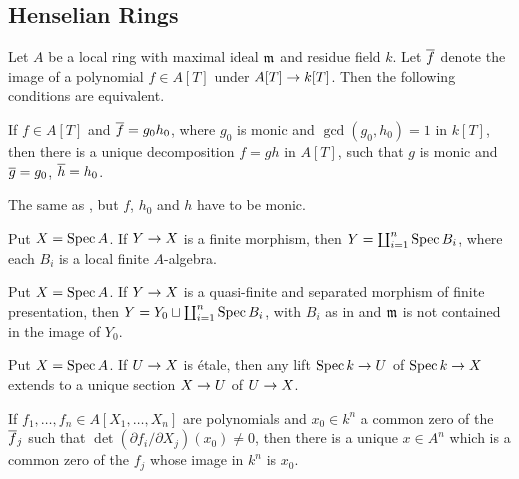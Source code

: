 \documentclass[a4paper, 10pt, oneside, DIV=9, chapterprefix=true, numbers=enddot, bibliography=totoc]{scrbook}
\begin{document}
\subsection{Henselian Rings}
\begin{prop}\label{prop:henselian}
	Let $A$ be a local ring with maximal ideal $\mathfrak{m}$ and residue field $k$. Let $\ov{f}$ denote the image of a polynomial $f\in A[T]$ under $A[T]\morphism k[T]$. Then the following conditions are equivalent.
	\begin{alphanumerate}
		\item If $f\in A[T]$ and $\ov{f}=g_0h_0$, where $g_0$ is monic and $\gcd(g_0,h_0)=1$ in $k[T]$, then there is a unique decomposition $f=gh$ in $A[T]$, such that $g$ is monic and $\ov{g}=g_0$, $\ov{h}=h_0$.
		\item The same as , but $f$, $h_0$ and $h$ have to be monic.
		\item Put $X=\operatorname{Spec} A$. If $Y\morphism X$ is a finite morphism, then $Y=\coprod_{i=1}^n\operatorname{Spec} B_i$, where each $B_i$ is a local finite $A$-algebra.
		\item Put $X=\operatorname{Spec} A$. If $Y\morphism X$ is a quasi-finite and separated morphism of finite presentation, then $Y=Y_0\sqcup\coprod_{i=1}^n\operatorname{Spec} B_i$, with $B_i$ as in  and $\mathfrak{m}$ is not contained in the image of $Y_0$.
		\item Put $X=\operatorname{Spec} A$. If $U\morphism X$ is étale, then any lift $\Spec k\morphism U$ of $\Spec k\morphism X$ extends to a unique section $X\morphism U$ of $U\morphism X$.
		\item If $f_1,\dotsc,f_n\in A[X_1,\dotsc,X_n]$ are polynomials and $x_0\in k^n$ a common zero of the $\ov{f}_j$ such that $\det(\partial f_i/\partial X_j)(x_0)\neq 0$, then there is a unique $x\in A^n$ which is a common zero of the $f_j$ whose image in $k^n$ is $x_0$.
	\end{alphanumerate}
\end{prop}
\end{document}

